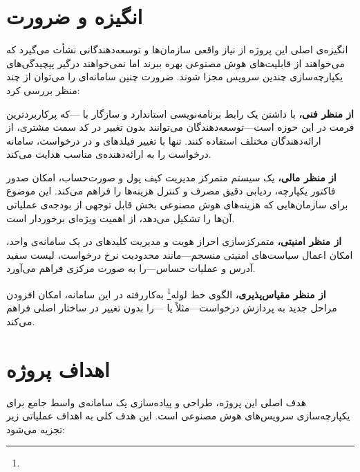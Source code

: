 \section{انگیزه و ضرورت}
\label{sec:motivation}

انگیزه‌ی اصلی این پروژه از نیاز واقعی سازمان‌ها و توسعه‌دهندگانی نشأت
می‌گیرد که می‌خواهند از قابلیت‌های هوش مصنوعی بهره ببرند اما نمی‌خواهند
درگیر پیچیدگی‌های یکپارچه‌سازی چندین سرویس مجزا شوند. ضرورت چنین
سامانه‌ای را می‌توان از چند منظر بررسی کرد:

\textbf{از منظر فنی،} با داشتن یک رابط برنامه‌نویسی استاندارد و سازگار با
—که پرکاربردترین فرمت در این حوزه است—توسعه‌دهندگان می‌توانند
بدون تغییر در کد سمت مشتری، از ارائه‌دهندگان مختلف استفاده کنند. تنها با
تغییر فیلدهای  و  در درخواست، سامانه
درخواست را به ارائه‌دهنده‌ی مناسب هدایت می‌کند.

\textbf{از منظر مالی،} یک سیستم متمرکز مدیریت کیف پول و صورت‌حساب،
امکان صدور فاکتور یکپارچه، ردیابی دقیق مصرف و کنترل هزینه‌ها را فراهم
می‌کند. این موضوع برای سازمان‌هایی که هزینه‌های هوش مصنوعی بخش قابل
توجهی از بودجه‌ی عملیاتی آن‌ها را تشکیل می‌دهد، از اهمیت ویژه‌ای
برخوردار است.

\textbf{از منظر امنیتی،} متمرکزسازی احراز هویت و مدیریت کلیدهای
 در یک سامانه‌ی واحد، امکان اعمال سیاست‌های امنیتی منسجم—مانند
محدودیت نرخ درخواست، لیست سفید آدرس  و 
عملیات حساس—را به صورت مرکزی فراهم می‌آورد.

\textbf{از منظر مقیاس‌پذیری،} الگوی خط لوله\footnote{}
به‌کاررفته در این سامانه، امکان افزودن مراحل جدید به پردازش درخواست—مثلاً
 یا —را
بدون تغییر در ساختار اصلی فراهم می‌کند.

\section{اهداف پروژه}
\label{sec:objectives}

هدف اصلی این پروژه، طراحی و پیاده‌سازی یک سامانه‌ی واسط جامع برای
یکپارچه‌سازی سرویس‌های هوش مصنوعی است. این هدف کلی به اهداف عملیاتی
زیر تجزیه می‌شود:

